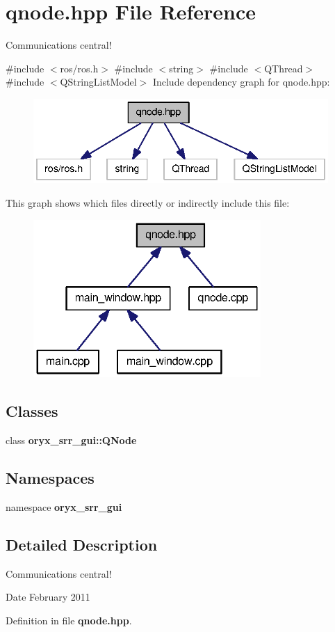 \section{qnode.\-hpp \-File \-Reference}
\label{qnode_8hpp}


\-Communications central!  


{\ttfamily \#include $<$ros/ros.\-h$>$}\*
{\ttfamily \#include $<$string$>$}\*
{\ttfamily \#include $<$\-Q\-Thread$>$}\*
{\ttfamily \#include $<$\-Q\-String\-List\-Model$>$}\*
\-Include dependency graph for qnode.\-hpp\-:
\nopagebreak
\begin{figure}[H]
\begin{center}
\leavevmode
\includegraphics[width=338pt]{qnode_8hpp__incl}
\end{center}
\end{figure}
\-This graph shows which files directly or indirectly include this file\-:
\nopagebreak
\begin{figure}[H]
\begin{center}
\leavevmode
\includegraphics[width=245pt]{qnode_8hpp__dep__incl}
\end{center}
\end{figure}
\subsection*{\-Classes}
\begin{DoxyCompactItemize}
\item 
class {\bf oryx\-\_\-srr\-\_\-gui\-::\-Q\-Node}
\end{DoxyCompactItemize}
\subsection*{\-Namespaces}
\begin{DoxyCompactItemize}
\item 
namespace {\bf oryx\-\_\-srr\-\_\-gui}
\end{DoxyCompactItemize}


\subsection{\-Detailed \-Description}
\-Communications central! \begin{DoxyDate}{\-Date}
\-February 2011 
\end{DoxyDate}


\-Definition in file {\bf qnode.\-hpp}.

